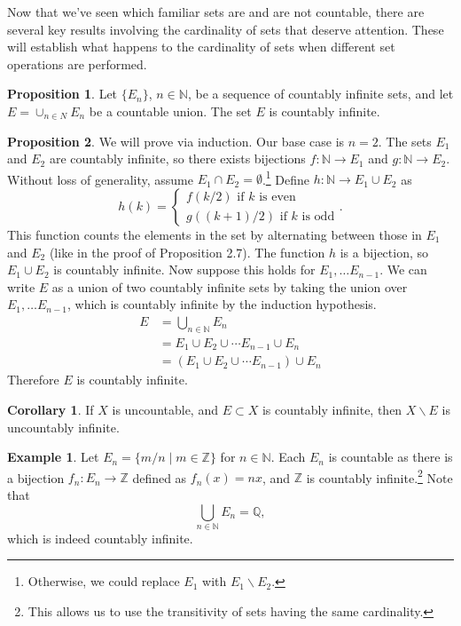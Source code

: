 \documentclass{article}
\newcommand{\N}{\mathbb{N}}
\newcommand{\Q}{\mathbb{Q}}
\newcommand{\Z}{\mathbb{Z}}
\theoremstyle{definition}
\newtheorem{proposition}{Proposition}[section]
\newtheorem{corollary}{Corollary}[section]
\newtheorem{example}{Example}[section]
\begin{document}
Now that we've seen which familiar sets are and are not countable, there are several key results involving the cardinality of sets that deserve attention. These will establish what happens to the cardinality of sets when different set operations are performed. 
\begin{proposition}
	Let $ \{E_n\} $, $ n\in\N $, be a sequence of countably infinite sets, and let $ E=\cup_{n\in N}E_n $ be a countable union. The set $ E $ is countably infinite. 
\end{proposition}
\begin{proposition}
	We will prove via induction. Our base case is $ n=2 $. The sets $ E_1 $ and $ E_2 $ are countably infinite, so there exists bijections $ f:\N\to E_1 $ and $ g:\N\to E_2 $. Without loss of generality, assume $ E_1\cap E_2=\emptyset $.\footnote{Otherwise, we could replace $ E_1 $ with $ E_1\backslash E_2 $.} Define $ h:\N\to E_1\cup E_2 $ as $$ h(k)=\begin{cases}
	f(k/2)\text{ if }k  \text{ is even}\\
		g((k+1)/2)\text{ if }k  \text{ is odd}
	\end{cases}. $$ This function counts the elements in the set by alternating between those in $ E_1 $ and $ E_2 $ (like in the proof of Proposition 2.7). The function $ h $ is a bijection, so $ E_1\cup E_2 $ is countably infinite. Now suppose this holds for $ E_1,\ldots E_{n-1} $. We can write $ E $ as a union of two countably infinite sets by taking the union over $ E_1,\ldots E_{n-1} $, which is countably infinite by the induction hypothesis. 
	\begin{align*}
		E&=\bigcup_{n\in \N} E_n\\
		 &=E_1\cup E_2\cup\cdots E_{n-1}\cup E_n\\
		 &=(E_1\cup E_2\cup\cdots E_{n-1})\cup E_n
	\end{align*} 
	Therefore $ E $ is countably infinite. 
\end{proposition}
\begin{corollary}
	If $ X $ is uncountable, and $ E\subset X $ is countably infinite, then $ X\backslash E$ is uncountably infinite.
\end{corollary}
\begin{example}
	Let $ E_n=\{m/n\mid m\in\Z\} $ for $ n\in\N $. Each $ E_n $ is countable as there is a bijection $ f_n:E_n\to\Z $ defined as $ f_n(x)=nx $, and $ \Z $ is countably infinite.\footnote{This allows us to use the transitivity of sets having the same cardinality.} Note that $$\bigcup_{n\in \N}E_n=\Q, $$ which is indeed countably infinite. 
\end{example}
\end{document}
